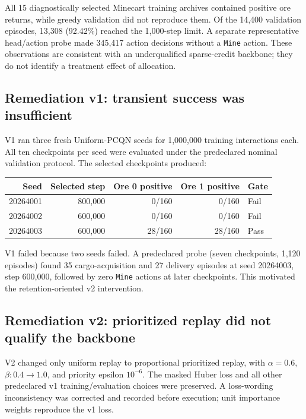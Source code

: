 All 15 diagnostically selected Minecart training archives contained positive
ore returns, while greedy validation did not reproduce them. Of the 14,400
validation episodes, 13,308 (92.42\%) reached the 1,000-step limit. A separate
representative head/action probe made 345,417 action decisions without a
\texttt{Mine} action. These observations are consistent with an underqualified
sparse-credit backbone; they do not identify a treatment effect of allocation.

\subsection{Remediation v1: transient success was insufficient}
V1 ran three fresh Uniform-PCQN seeds for 1,000,000 training interactions each.
All ten checkpoints per seed were evaluated under the predeclared nominal
validation protocol. The selected checkpoints produced:

\begin{center}
\begin{tabular}{@{}rrrrl@{}}
\toprule
\textbf{Seed} & \textbf{Selected step} & \textbf{Ore 0 positive} &
\textbf{Ore 1 positive} & \textbf{Gate} \\
\midrule
20264001 & 800,000 & 0/160 & 0/160 & Fail \\
20264002 & 600,000 & 0/160 & 0/160 & Fail \\
20264003 & 600,000 & 28/160 & 28/160 & Pass \\
\bottomrule
\end{tabular}
\end{center}

V1 failed because two seeds failed. A predeclared probe (seven checkpoints,
1,120 episodes) found 35 cargo-acquisition and 27 delivery episodes at seed
20264003, step 600,000, followed by zero \texttt{Mine} actions at later checkpoints.
This motivated the retention-oriented v2 intervention.

\subsection{Remediation v2: prioritized replay did not qualify the backbone}
V2 changed only uniform replay to proportional prioritized replay, with
$\alpha=0.6$, $\beta:0.4\rightarrow1.0$, and priority epsilon $10^{-6}$.
The masked Huber loss and all other predeclared v1 training/evaluation choices
were preserved. A loss-wording inconsistency was corrected and recorded before
execution; unit importance weights reproduce the v1 loss.

